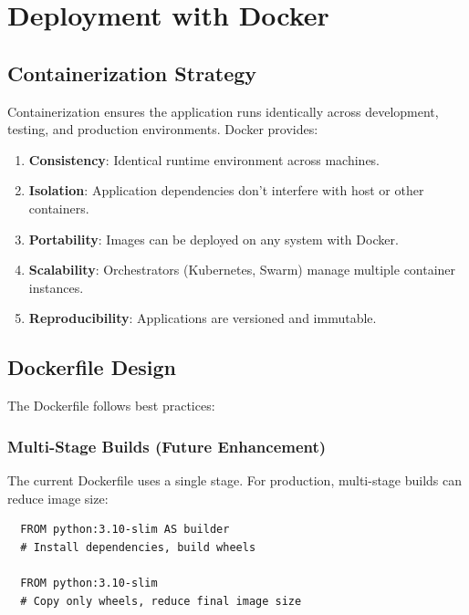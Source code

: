 \section{Deployment with Docker}
\label{sec:deployment}

\subsection{Containerization Strategy}

Containerization ensures the application runs identically across development, testing, and production 
environments. Docker provides:

\begin{enumerate}
  \item \textbf{Consistency}: Identical runtime environment across machines.
  
  \item \textbf{Isolation}: Application dependencies don't interfere with host or other containers.
  
  \item \textbf{Portability}: Images can be deployed on any system with Docker.
  
  \item \textbf{Scalability}: Orchestrators (Kubernetes, Swarm) manage multiple container instances.
  
  \item \textbf{Reproducibility}: Applications are versioned and immutable.
\end{enumerate}

\subsection{Dockerfile Design}

The Dockerfile follows best practices:

\subsubsection{Multi-Stage Builds (Future Enhancement)}

The current Dockerfile uses a single stage. For production, multi-stage builds can reduce image size:

\begin{verbatim}
  FROM python:3.10-slim AS builder
  # Install dependencies, build wheels
  
  FROM python:3.10-slim
  # Copy only wheels, reduce final image size
\end{verbatim}

